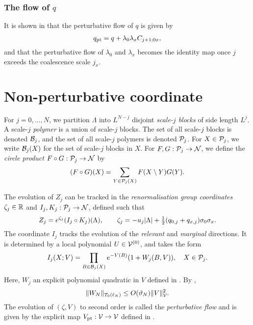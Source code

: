 
\subsubsection{The flow of \texorpdfstring{$q$}{q}}

It is shown in \cite[Proposition~\ref{phi4-prop:pt}]{ST-phi4}
that the perturbative flow of $q$ is given by
\begin{align}
\label{e:qpt}
q_{\rm pt} = q + \lambda_0 \lambda_x C_{j+1;0x},
\end{align}
and that the perturbative flow of $\lambda_0$ and $\lambda_x$ becomes the identity map
once $j$ exceeds the coalescence scale $j_x$.


\section{Non-perturbative coordinate}
\label{sec:rgcoord}

For $j=0,\ldots, N$, we partition $\Lambda$ into $L^{N-j}$ disjoint
\emph{scale-$j$ blocks} of side length $L^j$.
A scale-$j$ \emph{polymer} is a union of scale-$j$ blocks.
The set of all scale-$j$ blocks is denoted $\mathcal{B}_j$, and
the set of all scale-$j$ polymers is denoted $\mathcal{P}_j$.
For $X \in \mathcal{P}_j$, we write $\mathcal{B}_j(X)$ for the set of scale-$j$ blocks in $X$.
For $F, G : \mathcal{P}_j \rightarrow \mathcal{N}$, we define the \emph{circle product} $F \circ G : \mathcal{P}_j \rightarrow \mathcal{N}$ by
\begin{equation}
(F \circ G)(X) = \sum_{Y\in\mathcal{P}_j(X)} F(X \setminus Y) G(Y).
\end{equation}

The evolution of $Z_j$ can be tracked in the \emph{renormalisation group coordinates}
$\zeta_j \in {\mathbb R}$ and
$I_j, K_j : \mathcal{P}_j \rightarrow \mathcal{N}$, defined such that
\begin{equation}
\label{e:IcircKnew}
	Z_j = e^{\zeta_j}(I_j\circ K_j)(\Lambda),
	\qquad
	\zeta_j= - u_j|\Lambda|
	+ \textstyle{\frac 12} (q_{0,j} + q_{x,j}) \sigma_0\sigma_x
	.
\end{equation}
The coordinate $I_j$ tracks the evolution of the
\emph{relevant} and \emph{marginal} directions.  It
is determined by a local polynomial
$U\in \mathcal{V}^{(0)}$,
and takes the form
\begin{equation}
I_j(X; V)
	=
\prod_{B \in \mathcal{B}_j(X)} e^{-V(B)} (1 + W_j(B, V)), \quad X \in \mathcal{P}_j.
\end{equation}
Here, $W_j$ an explicit polynomial quadratic in $V$ defined in
\cite[\eqref{pt-e:WLTF}]{BBS-rg-pt}. By \cite[\eqref{IE-e:W-logwish}]{BS-rg-IE},
\begin{equation}
\label{e:Wbilinbd}
\|W_N\|_{T_0(\ell_N)}
	\le
O(\vartheta_N) \|V\|_{\mathcal{V}}^2.
\end{equation}
The evolution of $(\zeta, V)$ to second order is called the \emph{perturbative flow} and is
given by the explicit map $V_{\rm pt} : \mathcal{V} \rightarrow \mathcal{V}$ defined in
\cite[\eqref{pt-e:Vptdef}]{BBS-rg-pt}.

